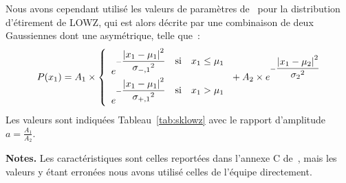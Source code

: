 \documentclass[../main/main.tex]{subfiles}
\begin{document}
Nous avons cependant utilisé les valeurs de paramètres de~\cite{scolnic2018}
pour la distribution d'étirement de LOWZ, qui est alors décrite par une
combinaison de deux Gaussiennes dont une asymétrique, telle que~:
\begin{equation}\label{eq:sklowz}
    P(x_1) = A_1\times
        \left\{
        \begin{array}{l}
            e^{-\displaystyle\frac{\abs{x_1-\mu_1}^2}{\sigma_{-,1}{}^2}
                \quad\text{si}\quad x_1\leq\mu_1} \\
            e^{-\displaystyle\frac{\abs{x_1-\mu_1}^2}{\sigma_{+,1}{}^2}
                \quad\text{si}\quad x_1>\mu_1} \\
        \end{array}
        \right. + A_2\times
        e^{-\displaystyle\frac{\abs{x_1-\mu_2}^2}{\sigma_{2}{}^2}}
\end{equation}
Les valeurs sont indiquées Tableau~\ref{tab:sklowz} avec le rapport d'amplitude
$a=\frac{A_1}{A_2}$. 

\begin{table}[ht]
    \centering
        \caption[Paramètres de la distribution d'étirement pour l'échantillon
        LOWZ des simulations SK]{Paramètres de la distribution sous-jacente
            d'étirement pour l'échantillon LOWZ dans notre reproduction de
        l'étude de~.}\label{tab:sklowz}
    \begin{threeparttable}
        \begin{tablenotes}[flushleft]
        \item\small \textbf{\hspace{-3,2pt}Notes.} Les caractéristiques sont
            celles reportées dans l'annexe C de~\cite{scolnic2018}, mais les
            valeurs y étant erronées nous avons utilisé celles de l'équipe
            directement.
        \end{tablenotes}
    \end{threeparttable}
\end{table}
\end{document}
